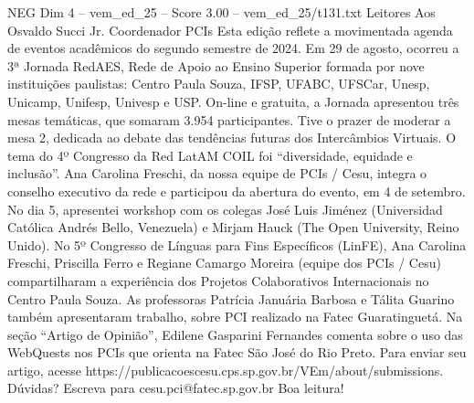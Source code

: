\begin{textsample}{NEG Dim 4 – vem\_ed\_25 – Score 3.00 – vem\_ed\_25/t131.txt}  \label{ex:f4_neg_118}
Leitores Aos Osvaldo Succi Jr.
Coordenador PCIs Esta edição reflete a movimentada agenda de eventos acadêmicos do segundo semestre de 2024.
Em 29 de agosto, ocorreu a 3ª Jornada RedAES, Rede de Apoio ao Ensino Superior formada por nove instituições paulistas: Centro Paula Souza, IFSP, UFABC, UFSCar, Unesp, Unicamp, Unifesp, Univesp e USP.
On-line e gratuita, a Jornada apresentou três mesas temáticas, que somaram 3.954 participantes.
Tive o prazer de moderar a mesa 2, dedicada ao debate das tendências futuras dos Intercâmbios Virtuais.
O tema do 4º Congresso da Red LatAM COIL foi “diversidade, equidade e inclusão”.
Ana Carolina Freschi, da nossa equipe de PCIs / Cesu, integra o conselho executivo da rede e participou da abertura do evento, em 4 de setembro.
No dia 5, apresentei workshop com os colegas José Luis Jiménez (Universidad Católica Andrés Bello, Venezuela) e Mirjam Hauck (The Open University, Reino Unido).
No 5º Congresso de Línguas para Fins Específicos (LinFE), Ana Carolina Freschi, Priscilla Ferro e Regiane Camargo Moreira (equipe dos PCIs / Cesu) compartilharam a experiência dos Projetos Colaborativos Internacionais no Centro Paula Souza.
As professoras Patrícia Januária Barbosa e Tálita Guarino também apresentaram trabalho, sobre PCI realizado na Fatec Guaratinguetá.
Na seção “Artigo de Opinião”, Edilene Gasparini Fernandes comenta sobre o uso das WebQuests nos PCIs que orienta na Fatec São José do Rio Preto.
Para enviar seu artigo, acesse https://publicacoescesu.cps.sp.gov.br/VEm/about/submissions.
Dúvidas?
Escreva para cesu.pci@fatec.sp.gov.br Boa leitura!

\end{textsample}
